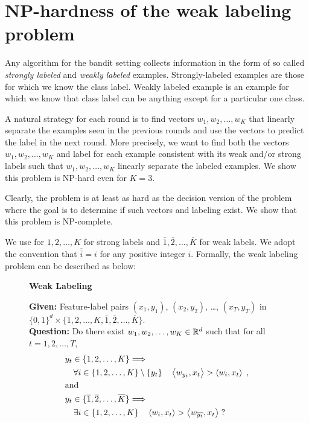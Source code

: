 \section{NP-hardness of the weak labeling problem}

Any algorithm for the bandit setting collects information in the form of so
called \emph{strongly labeled} and \emph{weakly labeled} examples.
Strongly-labeled examples are those for which we know the class label. Weakly
labeled example is an example for which we know that class label can be anything
except for a particular one class.

A natural strategy for each round is to find vectors $w_1, w_2, \dots, w_K$ that
linearly separate the examples seen in the previous rounds and use the vectors
to predict the label in the next round. More precisely, we want to find both the
vectors $w_1, w_2, \dots, w_K$ and label for each example consistent with its
weak and/or strong labels such that $w_1, w_2, \dots, w_K$ linearly separate the
labeled examples. We show this problem is NP-hard even for $K=3$.

Clearly, the problem is at least as hard as the decision version of the problem
where the goal is to determine if such vectors and labeling exist. We show that
this problem is NP-complete.

We use for $1,2,\dots,K$ for strong labels and $\overline{1}, \overline{2},
\dots, \overline{K}$ for weak labels. We adopt the convention that
$\overline{\overline{i}} = i$ for any positive integer $i$. Formally, the weak
labeling problem can be described as below:
\begin{figure}[H]
\begin{framed}
\begin{center}
    \textbf{Weak Labeling}
\end{center}
\textbf{Given:} Feature-label pairs $(x_1, y_1)$, $(x_2, y_2)$, \dots, $(x_T, y_T)$ in $\{0,1\}^d \times \{1,2,\dots, K, \overline{1}, \overline{2}, \dots, \overline{K}\}$. \\
\textbf{Question:} Do there exist $ w_1, w_2, \dots, w_K \in \mathbb{R}^d$ such that for all $t=1,2,\dots,T$,
\begin{align*}
& y_t \in \{1,2,\dots,K\} \Longrightarrow  \\
& \quad \forall i \in \{1,2,\dots,K\} \setminus \{y_t\} \quad \left\langle w_{y_t}, x_t \right\rangle  > \left\langle w_i, x_t \right\rangle \; , \\
& \text{and} \\
& y_t \in \{\overline{1}, \overline{2},\dots, \overline{K}\} \Longrightarrow \\
& \quad \exists i \in \{1,2,\dots,K\} \quad \left\langle w_i, x_t \right\rangle > \left\langle w_{\overline{y_t}}, x_t \right\rangle \; ?
\end{align*}
\end{framed}
\end{figure}


